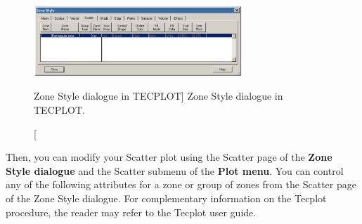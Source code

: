 \begin{figure}[H]%
\begin{center}
%
  \includegraphics[width=0.7\textwidth]{./graphics/zone_style}
%
\end{center}
\caption
[Zone Style dialogue in TECPLOT]
{Zone Style dialogue in TECPLOT.}
\label{fig:zone_style}
\end{figure}

Then, you can modify your Scatter plot using the Scatter page of the
\textbf{Zone Style dialogue} and the Scatter submenu of the \textbf{Plot menu}.
You can control any of the following attributes for a zone or group of zones
from the Scatter page of the Zone Style dialogue. For complementary information
on the Tecplot procedure, the reader may refer to the Tecplot user guide.
